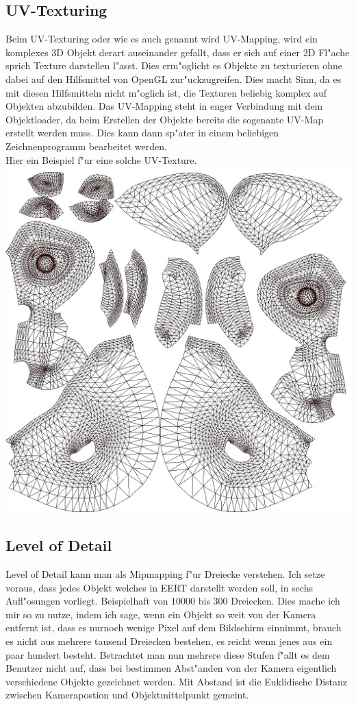 \documentclass[a4paper,titlepage]{article}
\begin{document}
\subsection{UV-Texturing}
Beim UV-Texturing oder wie es auch genannt wird UV-Mapping, wird ein komplexes 3D Objekt derart auseinander 
gefallt, dass er sich auf einer 2D Fl"ache sprich Texture darstellen l"asst. Dies erm"oglicht es Objekte zu 
texturieren ohne dabei auf den Hilfsmittel von OpenGL zur"uckzugreifen. Dies macht Sinn, da es mit diesen 
Hilfsmitteln nicht m"oglich ist, die Texturen beliebig komplex auf Objekten abzubilden. Das UV-Mapping steht 
in enger Verbindung mit dem Objektloader, da beim Erstellen der Objekte bereits die sogenante UV-Map erstellt 
werden muss. Dies kann dann sp"ater in einem beliebigen Zeichnenprogramm bearbeitet werden.\\

Hier ein Beispiel f"ur eine solche UV-Texture.\\
\includegraphics[width = 1.0\textwidth]{t10138u_Suzanne.png}\\

\subsection{Level of Detail}
Level of Detail kann man als Mipmapping f"ur Dreiecke verstehen. Ich setze voraus, dass jedes Objekt welches 
in EERT darstellt werden soll, in sechs Aufl"osungen vorliegt. Beispielhaft von 10000 bis 300 Dreiecken. Dies 
mache ich mir so zu nutze, indem ich sage, wenn ein Objekt so weit von der Kamera entfernt ist, dass es nurnoch 
wenige Pixel auf dem Bildschirm einnimmt, brauch es nicht aus mehrere tausend Dreiecken bestehen, es reicht 
wenn jenes aus ein paar hundert besteht.
Betrachtet man nun mehrere diese Stufen f"allt es dem Benutzer nicht auf, dass bei bestimmen Abst"anden von 
der Kamera eigentlich verschiedene Objekte gezeichnet werden. Mit Abstand ist die Euklidische Distanz zwischen
Kamerapostion und Objektmittelpunkt gemeint.
\end{document}
